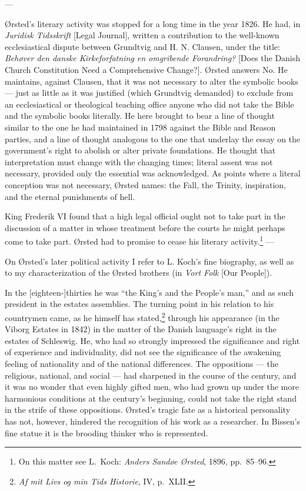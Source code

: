 \documentclass[12pt,a4paper]{book}
\newcommand{\opage}[1]{\marginnote{\footnotesize\textit{[#1]}}}
\begin{document}
\begin{center}---\end{center}

Ørsted's literary activity was stopped for a long time in the year 1826. He had, in
\emph{Juridisk Tidsskrift} [Legal Journal], written a contribution to the well-known
ecclesiastical dispute between Grundtvig and H. N. Clausen, under the title: \emph{Behøver
den danske Kirkeforfatning en omgribende Forandring?} [Does the Danish Church Constitution
Need a Comprehensive Change?]. Ørsted answers No. He maintains, against Clausen, that it
was not necessary to alter the symbolic books --- just as little as it was justified (which
Grundtvig demanded) to exclude from an ecclesiastical or theological teaching office anyone
who did not take the Bible and the symbolic books literally. He here brought to bear a \opage{80}line
of thought similar to the one he had maintained in 1798 against the Bible and Reason
parties, and a line of thought analogous to the one that underlay the essay on the
government's right to abolish or alter private foundations. He thought that interpretation
must change with the changing times; literal assent was not necessary, provided only the
essential was acknowledged. As points where a literal conception was not necessary, Ørsted
names: the Fall, the Trinity, inspiration, and the eternal punishments of hell.

King Frederik VI found that a high legal official ought not to take part in the discussion
of a matter in whose treatment before the courts he might perhaps come to take part. Ørsted
had to promise to cease his literary activity.\footnote{On this matter see L.\ Koch:
\emph{Anders Sandøe Ørsted}, 1896, pp.~85--96.} ---

On Ørsted's later political activity I refer to L. Koch's fine biography, as well as to my
characterization of the Ørsted brothers (in \emph{Vort Folk} [Our People]).

In the [eighteen-]thirties he was ``the King's and the People's man,'' and as such
president in the estates assemblies. The turning point in his relation to his countrymen
came, as he himself has stated,\footnote{\emph{Af mit Livs og min Tids Historie}, IV,
p.~XLII.} through his appearance (in the Viborg Estates in 1842) in the matter of the
Danish language's right in the estates of Schleswig. He, who had so strongly impressed the
significance and right of experience and individuality, did not see the significance of the
awakening feeling of nationality and of the national differences. The oppositions --- the
religious, national, and social --- had sharpened in the course of the century, and it was
no wonder that even highly gifted men, who had grown up under the more harmonious conditions
at the century's beginning, could not take the right stand in the strife of these
oppositions. Ørsted's tragic fate as a historical personality has not, however, hindered
the recognition of his work as a researcher. In Bissen's fine statue it is the brooding
thinker who is represented.
\end{document}
